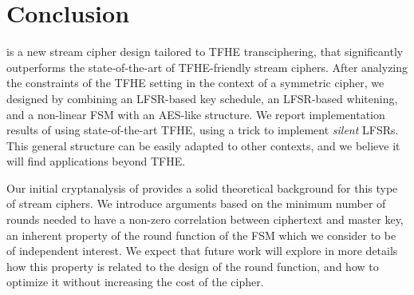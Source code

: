 
\section{Conclusion}
\label{sec:conclusion}


\coolName{} is a new stream cipher design tailored to TFHE
transciphering, that significantly outperforms the state-of-the-art of
TFHE-friendly stream ciphers.  After analyzing the constraints of the
TFHE setting in the context of a symmetric cipher, we designed
\coolName{} by combining an LFSR-based key schedule, an LFSR-based
whitening, and a non-linear FSM with an AES-like structure.  We report
implementation results of \coolName{} using state-of-the-art TFHE, using
a trick to implement \emph{silent} LFSRs.  This general structure can be
easily adapted to other contexts, and we believe it will find
applications beyond TFHE.

Our initial cryptanalysis of \coolName{} provides a solid
theoretical background for this type of stream ciphers.  We introduce
arguments based on the minimum number of rounds needed to have a
non-zero correlation between ciphertext and master key, an inherent
property of the round function of the FSM which we consider to be of
independent interest.  We expect that future work will explore in more
details how this property is related to the design of the round
function, and how to optimize it without increasing the cost of the
cipher.


